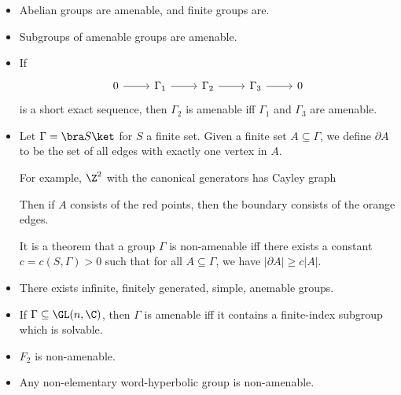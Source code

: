 \documentclass[a4paper]{article}
\newcommand\Free{F}
\begin{document}
\begin{eg}\leavevmode
  \begin{itemize}
    \item Abelian groups are amenable, and finite groups are.
    \item Subgroups of amenable groups are amenable.
    \item If
      \[
        \begin{tikzcd}
          0 \ar[r] & \Gamma_1 \ar[r] & \Gamma_2 \ar[r] & \Gamma_3 \ar[r] & 0
        \end{tikzcd}
      \]
      is a short exact sequence, then $\Gamma_2$ is amenable iff $\Gamma_1$ and $\Gamma_3$ are amenable.
    \item Let $\Gamma = \bra S \ket$ for $S$ a finite set. Given a finite set $A \subseteq \Gamma$, we define $\partial A$ to be the set of all edges with exactly one vertex in $A$.

      For example, $\Z^2$ with the canonical generators has Cayley graph
      \begin{center}
      \end{center}
      Then if $A$ consists of the red points, then the boundary consists of the orange edges.

      It is a theorem that a group $\Gamma$ is non-amenable iff there exists a constant $c = c(S, \Gamma) > 0$ such that for all $A \subseteq \Gamma$, we have $|\partial A| \geq c|A|$.
    \item There exists infinite, finitely generated, simple, anemable groups.
    \item If $\Gamma \subseteq \GL(n, \C)$, then $\Gamma$ is amenable iff it contains a finite-index subgroup which is solvable.
    \item $\Free_2$ is non-amenable.
    \item Any non-elementary word-hyperbolic group is non-amenable.
  \end{itemize}
\end{eg}
\end{document}
